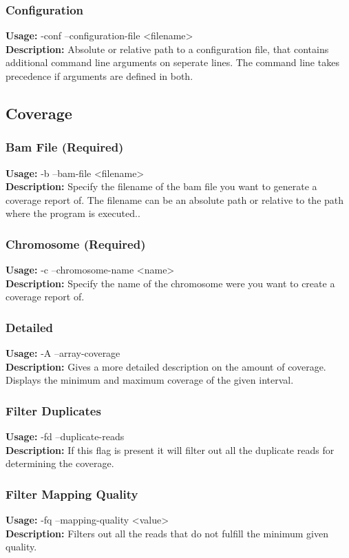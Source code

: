 \subsubsection{Configuration}
\textbf{Usage:}  -conf --configuration-file <filename> \\
\textbf{Description:} Absolute or relative path to a configuration file, that contains additional command line arguments on seperate lines. The command line takes precedence if arguments are defined in both.

\subsection{Coverage} \label{command:coverage}
\subsubsection{Bam File (Required)}
\textbf{Usage:} -b --bam-file <filename>\\
\textbf{Description:} Specify the filename of the bam file you want to generate a coverage report of. The filename can be an absolute path or relative to the path where the program is executed..

\subsubsection{Chromosome (Required)}
\textbf{Usage:} -c --chromosome-name <name>\\
\textbf{Description:} Specify the name of the chromosome were you want to create a coverage report of.

\subsubsection{Detailed}
\textbf{Usage:}  -A --array-coverage\\
\textbf{Description:} Gives a more detailed description on the amount of coverage. Displays the minimum and maximum coverage of the given interval.

\subsubsection{Filter Duplicates}
\textbf{Usage:}  -fd --duplicate-reads\\
\textbf{Description:} If this flag is present it will filter out all the duplicate reads for determining the coverage.

\subsubsection{Filter Mapping Quality}
\textbf{Usage:} -fq --mapping-quality <value>\\
\textbf{Description:} Filters out all the reads that do not fulfill the minimum given quality.

